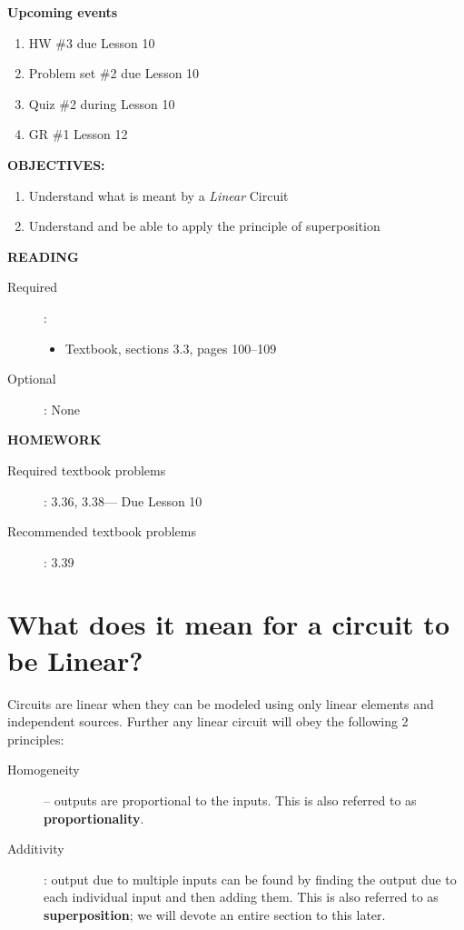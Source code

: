 \documentclass{handout}
\begin{document}
\maketitle

\textbf{Upcoming events}
\begin{enumerate}
\item HW \#3 due Lesson 10
\item Problem set \#2 due Lesson 10
\item Quiz \#2 during Lesson 10
\item GR \#1 Lesson 12
\end{enumerate}

\textbf{OBJECTIVES:}
\begin{enumerate}
\item Understand what is meant by a {\em Linear} Circuit
\item Understand and be able to apply the principle of superposition
\end{enumerate}

\textbf{READING}
\begin{description}
\item [Required]:
\begin{itemize}
\item  Textbook, sections 3.3, pages 100--109
\end{itemize}
\item [Optional]: None
\end{description}

\textbf{HOMEWORK}
\begin{description}
\item [Required textbook problems]: 3.36, 3.38--- Due Lesson 10
\item [Recommended textbook problems]: 3.39
\end{description}


\section{What does it mean for a circuit to be Linear?}
Circuits are linear when they can be modeled using only linear elements and independent sources.  Further any linear circuit will obey the following 2 principles:
\begin{description}
\item[Homogeneity]-- outputs are proportional to the inputs. This is also referred to as \textbf{proportionality}.
\item[Additivity]: output due to multiple inputs can be found by finding the output due to each individual input and then adding them.  This is also referred to as \textbf{superposition}; we will devote an entire section to this later.
\end{description}
\end{document}
